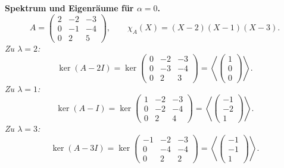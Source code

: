 \documentclass[11pt, a4paper]{article}
\begin{document}
\begin{framed}
\medskip
\textbf{Spektrum und Eigenräume für $\alpha=0$.}
\[
A=
\begin{pmatrix}2&-2&-3\\ 0&-1&-4\\ 0&2&5\end{pmatrix},\qquad
\chi_A(X)=(X-2)(X-1)(X-3).
\]
\emph{Zu $\lambda=2$:}
\[
\ker(A-2I)=
\ker\begin{pmatrix}0&-2&-3\\ 0&-3&-4\\ 0&2&3\end{pmatrix}
=\left\langle\begin{pmatrix}1\\0\\0\end{pmatrix}\right\rangle.
\]
\emph{Zu $\lambda=1$:}
\[
\ker(A-I)=
\ker\begin{pmatrix}1&-2&-3\\ 0&-2&-4\\ 0&2&4\end{pmatrix}
=\left\langle\begin{pmatrix}-1\\-2\\1\end{pmatrix}\right\rangle.
\]
\emph{Zu $\lambda=3$:}
\[
\ker(A-3I)=
\ker\begin{pmatrix}-1&-2&-3\\ 0&-4&-4\\ 0&2&2\end{pmatrix}
=\left\langle\begin{pmatrix}-1\\-1\\1\end{pmatrix}\right\rangle.
\]


\end{framed}
\end{document}
